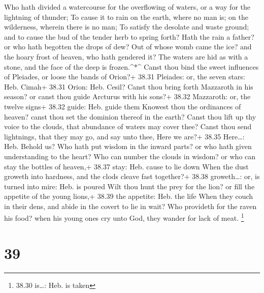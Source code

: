  Who hath divided a watercourse for the overflowing of
waters, or a way for the lightning of thunder;  To cause it
to rain on the earth, where no man is; on the wilderness, wherein there
is no man;  To satisfy the desolate and waste ground; and
to cause the bud of the tender herb to spring forth?  Hath
the rain a father? or who hath begotten the drops of dew? 
Out of whose womb came the ice? and the hoary frost of heaven, who hath
gendered it?  The waters are hid as with a stone, and the
face of the deep is frozen.\^{}*\^{}  Canst thou bind the
sweet influences of Pleiades, or loose the bands of Orion?+ 38.31
Pleiades: or, the seven stars: Heb. Cimah+ 38.31 Orion: Heb. Cesil?
 Canst thou bring forth Mazzaroth in his season? or canst
thou guide Arcturus with his sons?+ 38.32 Mazzaroth: or, the twelve
signs+ 38.32 guide: Heb. guide them  Knowest thou the
ordinances of heaven? canst thou set the dominion thereof in the earth?
 Canst thou lift up thy voice to the clouds, that abundance
of waters may cover thee?  Canst thou send lightnings, that
they may go, and say unto thee, Here we are?+ 38.35 Here\ldots: Heb.
Behold us?  Who hath put wisdom in the inward parts? or who
hath given understanding to the heart?  Who can number the
clouds in wisdom? or who can stay the bottles of heaven,+ 38.37 stay:
Heb. cause to lie down  When the dust groweth into
hardness, and the clods cleave fast together?+ 38.38 groweth\ldots: or,
is turned into mire: Heb. is poured  Wilt thou hunt the
prey for the lion? or fill the appetite of the young lions,+ 38.39 the
appetite: Heb. the life  When they couch in their dens, and
abide in the covert to lie in wait?  Who provideth for the
raven his food? when his young ones cry unto God, they wander for lack
of meat. \footnote{38.30 is\ldots: Heb. is taken}

\hypertarget{section-38}{%
\section{39}\label{section-38}}

